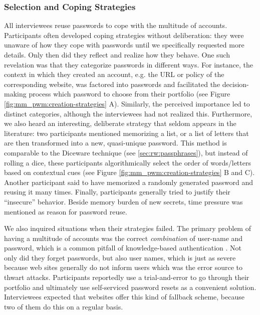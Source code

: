 

\subsubsection{Selection and Coping Strategies}
All interviewees reuse passwords to cope with the multitude of accounts. Participants often developed coping strategies without deliberation: they were unaware of how they cope with passwords until we specifically requested more details. Only then did they reflect and realize how they behave. One such revelation was that they categorize passwords in different ways. For instance, the context in which they created an account, e.g. the URL or policy of the corresponding website, was factored into passwords and facilitated the decision-making process which password to choose from their portfolio (see Figure \ref{fig:mm_pwm:creation-strategies} A). Similarly, the perceived importance led to distinct categories, although the interviewees had not realized this. Furthermore, we also heard an interesting, deliberate strategy that seldom appears in the literature: two participants mentioned memorizing a list, or a list of letters that are then transformed into a new, quasi-unique password. This method is comparable to the Diceware technique (see \ref{sec:rw:passphrases}), but instead of rolling a dice, these participants algorithmically select the order of words/letters based on contextual cues (see Figure \ref{fig:mm_pwm:creation-strategies} B and C). Another participant said to have memorized a randomly generated password and reusing it many times. Finally, participants generally tried to justify their ``insecure'' behavior. Beside memory burden of new secrets, time pressure was mentioned as reason for password reuse. 

We also inquired situations when their strategies failed. The primary problem of having a multitude of accounts was the correct \textit{combination} of user-name and password, which is a common pitfall of knowledge-based authentication \cite{Stobert2014PasswordLifeCycle}. Not only did they forget passwords, but also user names, which is just as severe because web sites generally do not inform users which was the error source to thwart attacks. Participants reportedly use a trial-and-error to go through their portfolio and ultimately use self-serviced password resets as a convenient solution. Interviewees expected that websites offer this kind of fallback scheme, because two of them do this on a regular basis. 

